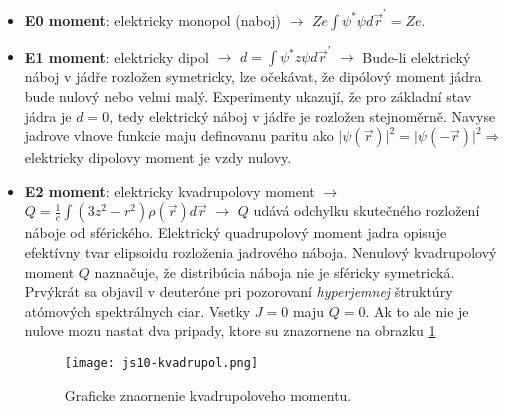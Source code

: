 \documentclass[../../main.tex]{subfiles}
\begin{document}
\begin{itemize}
	\item \textbf{E0 moment}: elektricky monopol (naboj) $\rightarrow$ $Ze\int \psi^{*}\psi d\vec{r}^{\prime}=Ze$.
	\item \textbf{E1 moment}: elektricky dipol $\rightarrow$ $d=\int \psi^{*}z\psi d\vec{r}^{\prime}$ $\rightarrow$ Bude-li elektrický náboj v jádře rozložen symetricky, lze očekávat, že dipólový moment jádra bude nulový nebo velmi malý. Experimenty ukazují, že pro základní stav jádra je $d=0$, tedy elektrický náboj v jádře je rozložen stejnoměrně. Navyse jadrove vlnove funkcie maju definovanu paritu ako $\lvert \psi(\vec{r}) \rvert^2 = \lvert \psi(-\vec{r}) \rvert^2 \Rightarrow$ elektricky dipolovy moment je vzdy nulovy.
	\item \textbf{E2 moment}: elektricky kvadrupolovy moment $\rightarrow$ $Q=\frac{1}{e} \int (3z^2-r^2)\rho(\vec{r})d\vec{r}$ $\rightarrow$  $Q$ udává odchylku skutečného rozložení náboje od sférického. Elektrický quadrupolový moment jadra opisuje efektívny tvar elipsoidu rozloženia jadrového náboja. Nenulový kvadrupolový moment $Q$ naznačuje, že distribúcia náboja nie je sféricky symetrická. Prvýkrát sa objavil v deuteróne pri pozorovaní \textit{hyperjemnej} štruktúry atómových spektrálnych ciar. Vsetky $J=0$ maju $Q=0$. Ak to ale nie je nulove mozu nastat dva pripady, ktore su znazornene na obrazku \ref{js10:kvadr}
	\begin{figure}[!h]
 	\centerline{\texttt{[image: js10-kvadrupol.png]}}
	\caption{Graficke znaornenie kvadrupoloveho momentu.}
 	\label{js10:kvadr}
	\end{figure}
\end{itemize}
\end{document}
